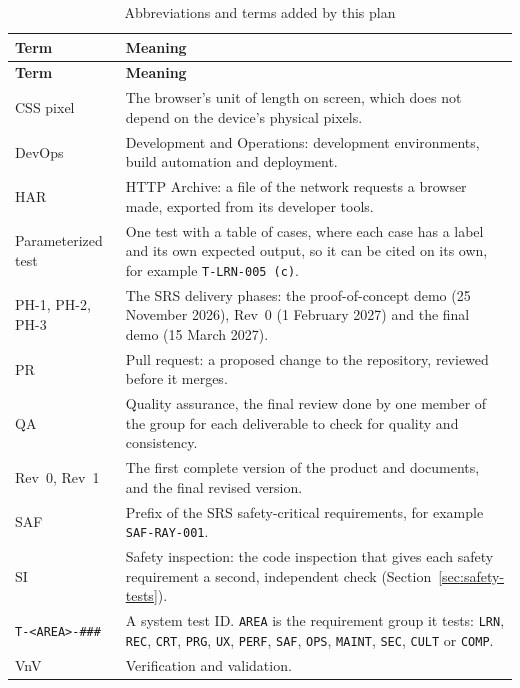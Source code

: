 \documentclass[12pt, titlepage]{article}
\begin{document}
{\small
\begin{longtable}{@{}>{\raggedright\arraybackslash}p{}
  >{\raggedright\arraybackslash}p{}@{}}
\caption{Abbreviations and terms added by this plan}
\label{tab:abbreviations}\\
\toprule
\textbf{Term} & \textbf{Meaning} \\
\midrule
\endfirsthead
\toprule
\textbf{Term} & \textbf{Meaning} \\
\midrule
\endhead
\bottomrule
\endlastfoot
CSS pixel & The browser's unit of length on screen, which does not depend on
the device's physical pixels. \\
DevOps & Development and Operations: development environments, build
automation and deployment. \\
HAR & HTTP Archive: a file of the network requests a browser made, exported
from its developer tools. \\
Parameterized test & One test with a table of cases, where each case has a
label and its own expected output, so it can be cited on its own, for
example \texttt{T-LRN-005 (c)}. \\
PH-1, PH-2, PH-3 & The SRS delivery phases: the proof-of-concept demo
(25 November 2026), Rev~0 (1 February 2027) and the final demo
(15 March 2027). \\
PR & Pull request: a proposed change to the repository, reviewed before it
merges. \\
QA & Quality assurance, the final review done by one member of the group
for each deliverable to check for quality and consistency. \\
Rev~0, Rev~1 & The first complete version of the product and documents, and
the final revised version. \\
SAF & Prefix of the SRS safety-critical requirements, for example
\texttt{SAF-RAY-001}. \\
SI & Safety inspection: the code inspection that gives each safety
requirement a second, independent check (Section~\ref{sec:safety-tests}). \\
\texttt{T-<AREA>-\#\#\#} & A system test ID. \texttt{AREA} is the
requirement group it tests: \texttt{LRN}, \texttt{REC}, \texttt{CRT},
\texttt{PRG}, \texttt{UX}, \texttt{PERF}, \texttt{SAF}, \texttt{OPS},
\texttt{MAINT}, \texttt{SEC}, \texttt{CULT} or \texttt{COMP}. \\
VnV & Verification and validation. \\
\end{longtable}
}
\end{document}
